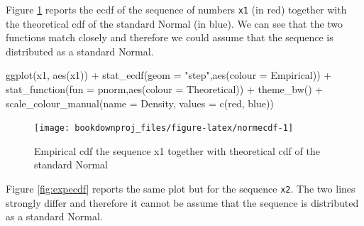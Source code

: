 \documentclass[
]{book}
\newenvironment{Shaded}{\begin{snugshade}}{\end{snugshade}}
\newcommand{\AttributeTok}[1]{\textcolor[rgb]{0.77,0.63,0.00}{#1}}
\newcommand{\FunctionTok}[1]{\textcolor[rgb]{0.00,0.00,0.00}{#1}}
\newcommand{\NormalTok}[1]{#1}
\newcommand{\SpecialCharTok}[1]{\textcolor[rgb]{0.00,0.00,0.00}{#1}}
\newcommand{\StringTok}[1]{\textcolor[rgb]{0.31,0.60,0.02}{#1}}
\theoremstyle{definition}
\theoremstyle{definition}
\theoremstyle{definition}
\theoremstyle{definition}
\theoremstyle{remark}
\begin{document}
Figure \ref{fig:normecdf} reports the ecdf of the sequence of numbers \texttt{x1} (in red) together with the theoretical cdf of the standard Normal (in blue). We can see that the two functions match closely and therefore we could assume that the sequence is distributed as a standard Normal.

\begin{Shaded}
\begin{Highlighting}[]
\FunctionTok{ggplot}\NormalTok{(x1, }\FunctionTok{aes}\NormalTok{(x1)) }\SpecialCharTok{+}
   \FunctionTok{stat\_ecdf}\NormalTok{(}\AttributeTok{geom =} \StringTok{"step"}\NormalTok{,}\FunctionTok{aes}\NormalTok{(}\AttributeTok{colour =} \StringTok{\textquotesingle{}Empirical\textquotesingle{}}\NormalTok{)) }\SpecialCharTok{+}
   \FunctionTok{stat\_function}\NormalTok{(}\AttributeTok{fun =}\NormalTok{ pnorm,}\FunctionTok{aes}\NormalTok{(}\AttributeTok{colour =} \StringTok{\textquotesingle{}Theoretical\textquotesingle{}}\NormalTok{)) }\SpecialCharTok{+}
   \FunctionTok{theme\_bw}\NormalTok{() }\SpecialCharTok{+}      
   \FunctionTok{scale\_colour\_manual}\NormalTok{(}\AttributeTok{name =} \StringTok{\textquotesingle{}Density\textquotesingle{}}\NormalTok{, }\AttributeTok{values =} \FunctionTok{c}\NormalTok{(}\StringTok{\textquotesingle{}red\textquotesingle{}}\NormalTok{, }\StringTok{\textquotesingle{}blue\textquotesingle{}}\NormalTok{))}
\end{Highlighting}
\end{Shaded}

\begin{figure}

{\centering \texttt{[image: bookdownproj\_files/figure-latex/normecdf-1]} 

}

\caption{Empirical cdf the sequence x1 together with theoretical cdf of the standard Normal}\label{fig:normecdf}
\end{figure}

Figure \ref{fig:expecdf} reports the same plot but for the sequence \texttt{x2}. The two lines strongly differ and therefore it cannot be assume that the sequence is distributed as a standard Normal.
\end{document}
